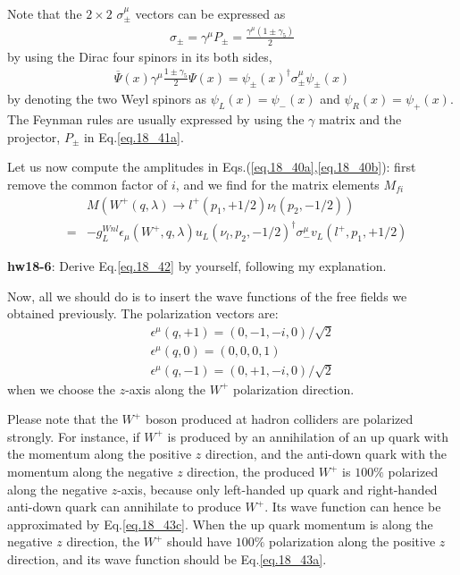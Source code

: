 \documentclass[12pt]{article}
\def\dgr{\dagger}
\def\eps{\epsilon}
\def\lmd{\lambda}
\begin{document}
Note that the $2\times 2$ $\sigma_\pm^\mu$ vectors can be expressed as
\begin{eqnarray}
    \sigma_\pm
=    \gamma^\mu P_\pm
=    \frac{\gamma^\mu (1 \pm \gamma_5)}{2} \label{eq.18_41a}
\end{eqnarray}
by using the Dirac four spinors in its both sides,
\begin{eqnarray}
    {\overline \Psi}(x) \gamma^\mu \frac{1 \pm \gamma_5}{2} \Psi(x)
=    \psi_\pm(x)^\dgr  \sigma_\pm^\mu  \psi_\pm(x) \label{eq.18_41b}
\end{eqnarray}
by denoting the two Weyl spinors as $\psi_L(x)=\psi_-(x)$ and
$\psi_R(x)=\psi_+(x)$.  The Feynman rules are usually expressed by
using the $\gamma$ matrix and the projector, $P_\pm$ in Eq.\ref{eq.18_41a}.

Let us now compute the amplitudes in Eqs.(\ref{eq.18_40a},\ref{eq.18_40b}): first remove the common factor of $i$, and we find for the matrix elements $M_{fi}$
\begin{eqnarray}
 &&   M(W^+(q,\lmd) \to l^+(p_1,+1/2) \nu_l(p_2,-1/2))\nonumber \\
&=& -g_L^{Wnl}
\eps_\mu(W^+,q,\lmd)
u_L(\nu_l,p_2,-1/2)^\dgr \sigma_-^\mu v_L(l^+,p_1,+1/2) \label{eq.18_42}
\end{eqnarray}

{\bf hw18-6}: Derive Eq.\ref{eq.18_42} by yourself, following my explanation.

Now, all we should do is to insert the wave functions of the free
fields we obtained previously.
The polarization vectors are:
\begin{eqnarray}
&&\eps^\mu(q,+1) = ( 0, -1, -i, 0 )/\sqrt2 \label{eq.18_43a} \\
&&\eps^\mu(q, 0) = ( 0,  0,  0, 1 ) \label{eq.18_43b} \\
&& \eps^\mu(q,-1) = ( 0, +1, -i, 0 )/\sqrt2 \label{eq.18_43c}
\end{eqnarray}
when we choose the $z$-axis along the $W^+$ polarization direction.

Please note that the $W^+$ boson produced at hadron colliders are
polarized strongly. For instance, if $W^+$ is produced by an
annihilation of an up quark with the momentum along the positive $z$
direction, and the anti-down quark with the momentum along the
negative $z$ direction, the produced $W^+$ is $100\%$ polarized along the
negative $z$-axis, because only left-handed up quark and right-handed
anti-down quark can annihilate to produce $W^+$.  Its wave function can
hence be approximated by Eq.\ref{eq.18_43c}.
When the up quark momentum is along the negative $z$ direction, the $W^+$
should have $100\%$ polarization along the positive $z$ direction, and
its wave function should be Eq.\ref{eq.18_43a}.
\end{document}
